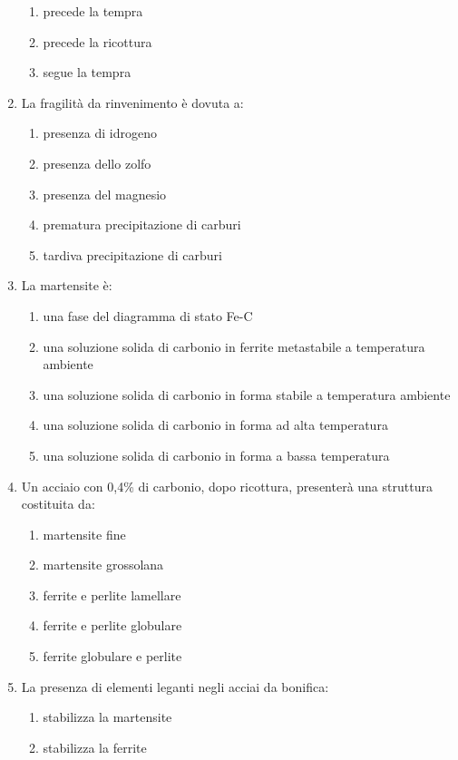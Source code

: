 \begin{enumerate}
\begin{enumerate}
        \item precede la tempra
        \item precede la ricottura
        \item segue la tempra
    \end{enumerate}
    \item La fragilità da rinvenimento è dovuta a:
    \begin{enumerate}
        \item presenza di idrogeno
        \item presenza dello zolfo
        \item presenza del magnesio
        \item prematura precipitazione di carburi
        \item tardiva precipitazione di carburi
    \end{enumerate}
    \item La martensite è:
    \begin{enumerate}
        \item una fase del diagramma di stato Fe-C
        \item una soluzione solida di carbonio in ferrite metastabile a temperatura ambiente
        \item una soluzione solida di carbonio in forma stabile a temperatura ambiente
        \item una soluzione solida di carbonio in forma ad alta temperatura
        \item una soluzione solida di carbonio in forma a bassa temperatura
    \end{enumerate}
    \item Un acciaio con 0,4\% di carbonio, dopo ricottura, presenterà una struttura costituita da:
    \begin{enumerate}
        \item martensite fine
        \item martensite grossolana
        \item ferrite e perlite lamellare
        \item ferrite e perlite globulare
        \item ferrite globulare e perlite
    \end{enumerate}
    \item La presenza di elementi leganti negli acciai da bonifica:
    \begin{enumerate}
        \item stabilizza la martensite
        \item stabilizza la ferrite

\end{enumerate}
\end{enumerate}
